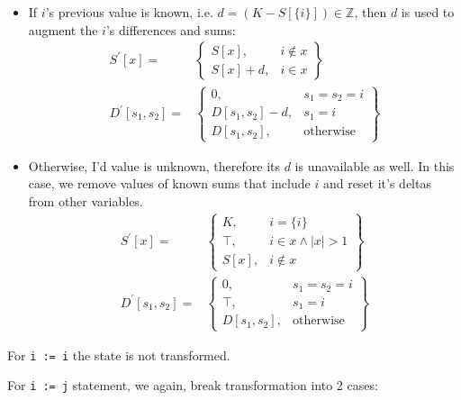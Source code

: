 \begin{itemize}
\item If $i$'s previous value is known, i.e. $d = (K - S[\{i\}]) \in \mathbb{Z}$, then $d$ is used to augment the $i$'s differences and sums:
\begin{align*}
S^\prime[x] = & \left.
	\begin{cases}
		S[x], & i \notin x \\
		S[x] + d, & i \in x
	\end{cases}
\right\}\\
D^\prime[s_1, s_2] = & \left.
	\begin{cases}
		0, & s_1 = s_2 = i \\
		D[s_1,s_2] - d, & s_1 = i \\
		D[s_1,s_2], & \text{otherwise}
	\end{cases}
\right\}
\end{align*}
\item Otherwise, I'd value is unknown, therefore its $d$ is unavailable as well. In this case, we remove values of known sums that include $i$ and reset it's deltas from other variables.
\begin{align*}
S^\prime[x] = & \left.
	\begin{cases}
	    K, & i = \{i\} \\
   		\top, & i \in x \wedge |x| > 1 \\
		S[x], & i \notin x 
	\end{cases}
\right\}\\
D^\prime[s_1, s_2] = & \left.
	\begin{cases}
		0, & s_1 = s_2 = i \\
		\top, & s_1 = i \\
		D[s_1,s_2], & \text{otherwise}
	\end{cases}
\right\}
\end{align*}
\end{itemize}

For \texttt{i := i} the state is not transformed.

For \texttt{i := j} statement, we again, break transformation into 2 cases:

